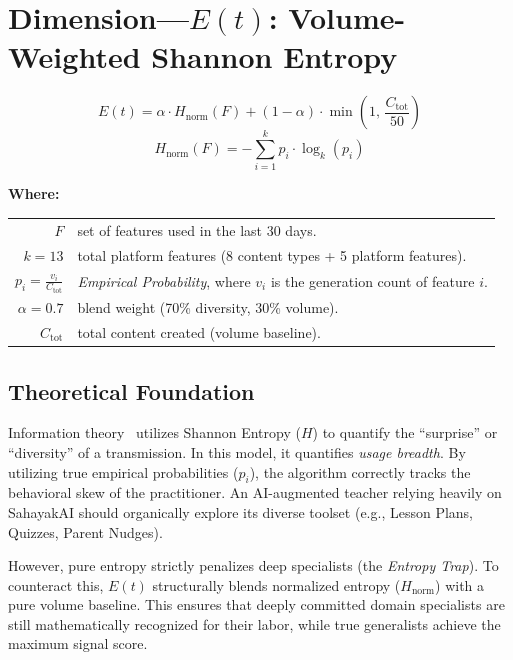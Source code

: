 \documentclass[11pt,a4paper]{article}
\begin{document}
\section{Dimension---$E(t)$: Volume-Weighted Shannon Entropy}

\begin{equation}
    E(t) = \alpha \cdot H_{\text{norm}}(F) + (1-\alpha) \cdot \min\!\left(1,\,\frac{C_{\text{tot}}}{50}\right)
\end{equation}
\begin{equation}
    H_{\text{norm}}(F) = -\sum_{i=1}^{k} p_i \cdot \log_k(p_i)
\end{equation}

\noindent \textbf{Where:}

\vspace{0.25em}
\noindent
\begin{tabular}{@{} r p{11cm} @{}}
    $F$ & set of features used in the last 30 days. \\
    $k = 13$ & total platform features (8 content types + 5 platform features). \\
    $p_i = \frac{v_i}{C_{\text{tot}}}$ & \textit{Empirical Probability}, where $v_i$ is the generation count of feature $i$. \\
    $\alpha = 0.7$ & blend weight (70\% diversity, 30\% volume). \\
    $C_{\text{tot}}$ & total content created (volume baseline). \\
\end{tabular}

\subsection{Theoretical Foundation}
Information theory~\cite{shannon1948} utilizes Shannon Entropy ($H$) to quantify the ``surprise'' or ``diversity'' of a transmission. In this model, it quantifies \textit{usage breadth}. By utilizing true empirical probabilities ($p_i$), the algorithm correctly tracks the behavioral skew of the practitioner. An AI-augmented teacher relying heavily on SahayakAI should organically explore its diverse toolset (e.g., Lesson Plans, Quizzes, Parent Nudges). 

However, pure entropy strictly penalizes deep specialists (the \textit{Entropy Trap}). To counteract this, $E(t)$ structurally blends normalized entropy ($H_{\text{norm}}$) with a pure volume baseline. This ensures that deeply committed domain specialists are still mathematically recognized for their labor, while true generalists achieve the maximum signal score.
\end{document}
